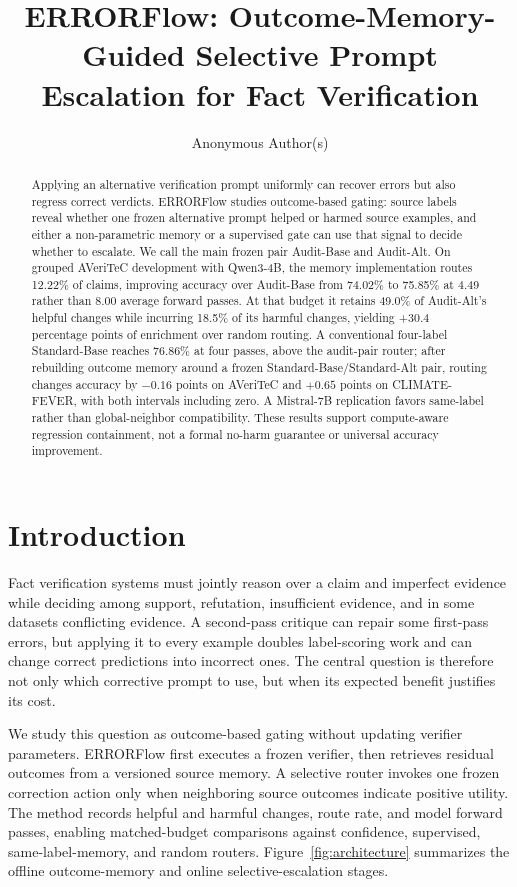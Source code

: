 \documentclass[runningheads]{llncs}
\title{ERRORFlow: Outcome-Memory-Guided Selective Prompt Escalation for Fact Verification}
\author{Anonymous Author(s)}
\institute{Anonymous Institution}
\begin{document}
\maketitle

\begin{abstract}
Applying an alternative verification prompt uniformly can recover errors but
also regress correct verdicts. ERRORFlow studies outcome-based gating: source
labels reveal whether one frozen alternative prompt helped or harmed source
examples, and either a non-parametric memory or a supervised gate can use
that signal to decide whether to escalate. We call the main frozen pair
Audit-Base and Audit-Alt. On grouped AVeriTeC development
with Qwen3-4B, the memory implementation routes 12.22\% of claims, improving
accuracy over Audit-Base from 74.02\% to 75.85\% at 4.49 rather
than 8.00 average forward passes. At that budget it retains 49.0\% of Audit-Alt's
helpful changes while incurring 18.5\% of its harmful changes, yielding
+30.4 percentage points of enrichment over random routing. A conventional
four-label Standard-Base reaches 76.86\% at four
passes, above the audit-pair router; after rebuilding outcome memory around a
frozen Standard-Base/Standard-Alt pair, routing changes accuracy by $-0.16$
points on AVeriTeC and $+0.65$ points on CLIMATE-FEVER, with both intervals
including zero.
A Mistral-7B replication favors same-label rather than global-neighbor
compatibility.
These results support compute-aware regression containment, not a formal
no-harm guarantee or universal accuracy improvement.
\end{abstract}

\section{Introduction}

Fact verification systems must jointly reason over a claim and imperfect
evidence while deciding among support, refutation, insufficient evidence, and
in some datasets conflicting evidence. A second-pass critique can repair some
first-pass errors, but applying it to every example doubles label-scoring work
and can change correct predictions into incorrect ones. The central question
is therefore not only which corrective prompt to use, but when its expected
benefit justifies its cost.

We study this question as outcome-based gating without updating verifier
parameters. ERRORFlow first
executes a frozen verifier, then retrieves residual outcomes from a
versioned source memory. A selective router invokes one frozen correction
action only when neighboring source outcomes indicate positive utility. The
method records helpful and harmful changes, route rate, and model forward
passes, enabling matched-budget comparisons against confidence, supervised,
same-label-memory, and random routers.
Figure~\ref{fig:architecture} summarizes the offline outcome-memory and online
selective-escalation stages.
\end{document}

